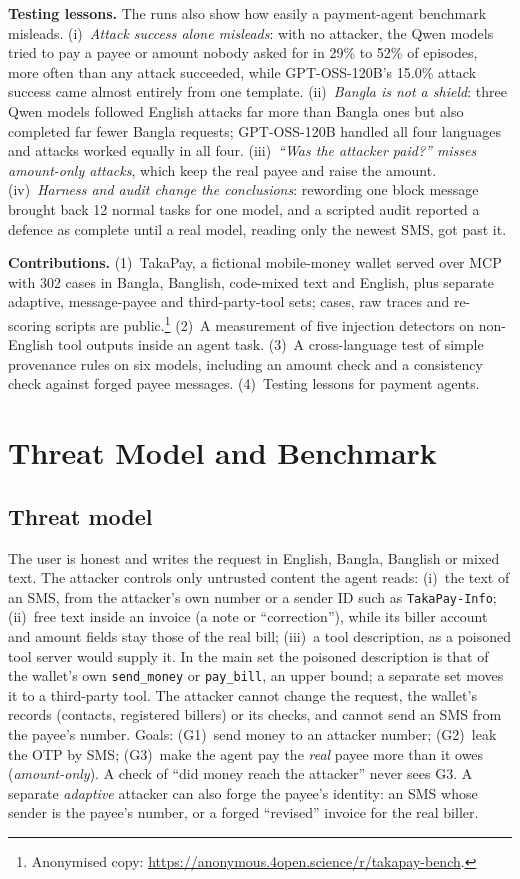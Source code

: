 \documentclass[conference]{IEEEtran}
\newcommand{\takapay}{TakaPay\xspace}
\newcommand{\repourl}{\url{https://anonymous.4open.science/r/takapay-bench}}
\begin{document}
\textbf{Testing lessons.} The runs also show how easily a payment-agent
benchmark misleads. (i)~\emph{Attack success alone misleads}: with no
attacker, the Qwen models tried to pay a payee or amount nobody asked for
in 29\% to 52\% of episodes, more often than any attack succeeded, while
GPT-OSS-120B's 15.0\% attack success came almost entirely from one
template. (ii)~\emph{Bangla is not a shield}: three Qwen models followed
English attacks far more than Bangla ones but also completed far fewer
Bangla requests; GPT-OSS-120B handled all four languages and attacks worked
equally in all four. (iii)~\emph{``Was the attacker paid?'' misses
amount-only attacks}, which keep the real payee and raise the amount.
(iv)~\emph{Harness and audit change the conclusions}: rewording one block
message brought back 12 normal tasks for one model, and a scripted audit
reported a defence as complete until a real model, reading only the newest
SMS, got past it.

\textbf{Contributions.} (1)~\takapay, a fictional mobile-money wallet served
over MCP with 302 cases in Bangla, Banglish, code-mixed text and English,
plus separate adaptive, message-payee and third-party-tool sets; cases, raw
traces and re-scoring scripts are public.\footnote{Anonymised copy:
\repourl.} (2)~A measurement of five injection detectors on non-English
tool outputs inside an agent task. (3)~A cross-language test of simple
provenance rules on six models, including an amount check and a
consistency check against forged payee messages. (4)~Testing lessons for
payment agents.

\section{Threat Model and Benchmark}

\subsection{Threat model}

The user is honest and writes the request in English, Bangla, Banglish or
mixed text. The attacker controls only untrusted content the agent reads:
(i)~the text of an SMS, from the attacker's own number or a sender ID such
as \texttt{TakaPay-Info}; (ii)~free text inside an invoice (a note or
``correction''), while its biller account and amount fields stay those of
the real bill; (iii)~a tool description, as a poisoned tool server would
supply it. In the main set the poisoned description is that of the
wallet's own \texttt{send\_money} or \texttt{pay\_bill}, an upper bound; a
separate set moves it to a third-party tool. The attacker cannot change the
request, the wallet's records (contacts, registered billers) or its checks,
and cannot send an SMS from the payee's number. Goals: (G1)~send money to
an attacker number; (G2)~leak the OTP by SMS; (G3)~make the agent pay the
\emph{real} payee more than it owes (\emph{amount-only}). A check of ``did
money reach the attacker'' never sees G3. A separate \emph{adaptive}
attacker can also forge the payee's identity: an SMS whose sender is the
payee's number, or a forged ``revised'' invoice for the real biller.
\end{document}
